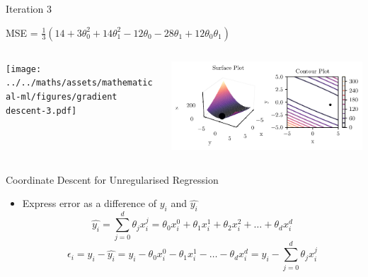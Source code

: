 \documentclass{beamer}
\begin{document}
\begin{frame}{Iteration 3}

MSE = $\frac{1}{3}(14+3\theta_{0}^{2}+14\theta_{1}^{2}-12\theta_{0}-28\theta_{1}+12\theta_{0}\theta_{1})$\\

\begin{columns}
\begin{column}{0.6\textwidth}
\begin{adjustbox}{max totalsize={\textwidth},center}
\texttt{[image: ../../maths/assets/mathematical-ml/figures/gradient descent-3.pdf]}
\end{adjustbox}

\end{column}
\begin{column}{0.5\textwidth}
\begin{adjustbox}{max totalsize={\textwidth},center}
\includegraphics[width=\textwidth]{../../maths/assets/mathematical-ml/figures/contour-linreg-3.pdf}
\end{adjustbox}
\end{column}
\end{columns}


\end{frame}


%


\begin{frame}{Coordinate Descent for Unregularised Regression}

\begin{itemize}[<+->]
	
	
	
	
	
	\item Express error as a difference of $y_{i}$ and $\hat{y_{i}}$
	\begin{equation}
	\hat{y_i} = \sum_{j=0}^{d} \theta_{j}x^{j}_{i} = \theta_{0}x_{i}^{0} + \theta_{1}x_{i}^{1} +\theta_{2}x_{i}^{2} + \ldots + \theta_{d}x_{i}^{d}
	\end{equation}
	\begin{equation}
	\epsilon_{i} = y_{i} - \hat{y_{i}} = y_{i} - \theta_{0}x_{i}^{0} - \theta_{1}x_{i}^{1} - \ldots - \theta_{d}x_{i}^{d} = y_{i} - \sum_{j=0}^{d} \theta_{j}x_{i}^{j}
	\end{equation}
	
	
	
\end{itemize}


\end{frame}
\end{document}
